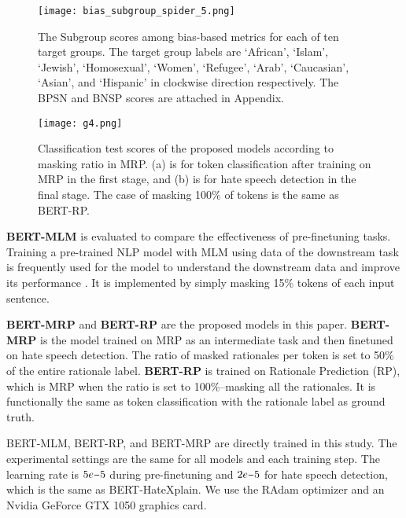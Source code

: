 \documentclass[11pt]{article}
\newcommand{\minus}{\scalebox{0.75}[1.0]{$-$}}
\begin{document}
\begin{figure}[!t] \begin{center}
    \texttt{[image: bias\_subgroup\_spider\_5.png]}
    \end{center}
    \caption{The Subgroup scores among bias-based metrics for each of ten target groups. The target group labels are `African', `Islam', `Jewish', `Homosexual', `Women', `Refugee', `Arab', `Caucasian', `Asian', and `Hispanic' in clockwise direction respectively. The BPSN and BNSP scores are attached in Appendix.}
    \label{fig:long}
    \label{fig:onecol}
\label{bias_graph_sub}
\end{figure}

\begin{figure}[!t]
    \centering
    \texttt{[image: g4.png]}
    \caption{Classification test scores of the proposed models according to masking ratio in MRP. (a) is for token classification after training on MRP in the first stage, and (b) is for hate speech detection in the final stage. The case of masking 100\% of tokens is the same as BERT-RP.}
    \label{fig:my_label}
    \label{fig:long}
    \label{fig:onecol}
\label{ratio_graph}
\end{figure}


\textbf{BERT-MLM} is evaluated to compare the effectiveness of pre-finetuning tasks. Training a pre-trained NLP model with MLM using data of the downstream task is frequently used for the model to understand the downstream data and improve its performance \citep{han2019unsupervised, ben2020perl, arefyev2021nb}. It is implemented by simply masking 15\% tokens of each input sentence.

\textbf{BERT-MRP} and \textbf{BERT-RP} are the proposed models in this paper. \textbf{BERT-MRP} is the model trained on MRP as an intermediate task and then finetuned on hate speech detection. The ratio of masked rationales per token is set to 50\% of the entire rationale label. \textbf{BERT-RP} is trained on Rationale Prediction (RP), which is MRP when the ratio is set to 100\%--masking all the rationales. It is functionally the same as token classification with the rationale label as ground truth.

BERT-MLM, BERT-RP, and BERT-MRP are directly trained in this study. The experimental settings are the same for all models and each training step. The learning rate is $5e\minus 5$ during pre-finetuning and $2e\minus 5$ for hate speech detection, which is the same as BERT-HateXplain. We use the RAdam optimizer and an Nvidia GeForce GTX 1050 graphics card.
\end{document}
